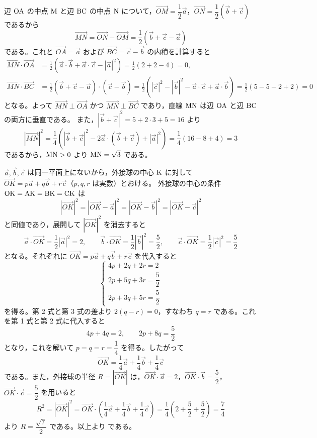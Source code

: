 辺 $\mathrm{OA}$ の中点 $\mathrm{M}$ と辺 $\mathrm{BC}$ の中点 $\mathrm{N}$ について，$\Vec{OM}=\dfrac{1}{2}\vec{a}$，$\Vec{ON}=\dfrac{1}{2}(\vec{b}+\vec{c})$ であるから
\[
  \Vec{MN}=\Vec{ON}-\Vec{OM}=\frac{1}{2}(\vec{b}+\vec{c}-\vec{a})
\]
である。これと $\Vec{OA}=\vec{a}$ および $\Vec{BC}=\vec{c}-\vec{b}$ の内積を計算すると
\begin{align*}
  \Vec{MN}\cdot\Vec{OA} &= \frac{1}{2}(\vec{a}\cdot\vec{b}+\vec{a}\cdot\vec{c}-|\vec{a}|^{2})=\frac{1}{2}(2+2-4)=0, \\
  \Vec{MN}\cdot\Vec{BC} &= \frac{1}{2}(\vec{b}+\vec{c}-\vec{a})\cdot(\vec{c}-\vec{b})=\frac{1}{2}\left(|\vec{c}|^{2}-|\vec{b}|^{2}-\vec{a}\cdot\vec{c}+\vec{a}\cdot\vec{b}\right)=\frac{1}{2}(5-5-2+2)=0
\end{align*}
となる。よって $\Vec{MN}\perp\Vec{OA}$ かつ $\Vec{MN}\perp\Vec{BC}$ であり，直線 $\mathrm{MN}$ は辺 $\mathrm{OA}$ と辺 $\mathrm{BC}$ の両方に垂直である。
また，$|\vec{b}+\vec{c}|^{2}=5+2\cdot 3+5=16$ より
\[
  |\Vec{MN}|^{2}=\frac{1}{4}\left(|\vec{b}+\vec{c}|^{2}-2\vec{a}\cdot(\vec{b}+\vec{c})+|\vec{a}|^{2}\right)
  =\frac{1}{4}(16-8+4)=3
\]
であるから，$\mathrm{MN}>0$ より $\mathrm{MN}=\sqrt{3}$ である。

$\vec{a}, \vec{b}, \vec{c}$ は同一平面上にないから，外接球の中心 $\mathrm{K}$ に対して $\Vec{OK}=p\vec{a}+q\vec{b}+r\vec{c}$（$p, q, r$ は実数）とおける。
外接球の中心の条件 $\mathrm{OK}=\mathrm{AK}=\mathrm{BK}=\mathrm{CK}$ は
\[
  |\Vec{OK}|^{2}=|\Vec{OK}-\vec{a}|^{2}=|\Vec{OK}-\vec{b}|^{2}=|\Vec{OK}-\vec{c}|^{2}
\]
と同値であり，展開して $|\Vec{OK}|^{2}$ を消去すると
\[
  \vec{a}\cdot\Vec{OK}=\frac{1}{2}|\vec{a}|^{2}=2,\qquad
  \vec{b}\cdot\Vec{OK}=\frac{1}{2}|\vec{b}|^{2}=\frac{5}{2},\qquad
  \vec{c}\cdot\Vec{OK}=\frac{1}{2}|\vec{c}|^{2}=\frac{5}{2}
\]
となる。それぞれに $\Vec{OK}=p\vec{a}+q\vec{b}+r\vec{c}$ を代入すると
\[
  \begin{cases}
    4p+2q+2r=2 \\[2pt]
    2p+5q+3r=\dfrac{5}{2} \\[4pt]
    2p+3q+5r=\dfrac{5}{2}
  \end{cases}
\]
を得る。第 2 式と第 3 式の差より $2(q-r)=0$，すなわち $q=r$ である。これを第 1 式と第 2 式に代入すると
\[
  4p+4q=2,\qquad 2p+8q=\frac{5}{2}
\]
となり，これを解いて $p=q=r=\dfrac{1}{4}$ を得る。したがって
\[
  \Vec{OK}=\frac{1}{4}\vec{a}+\frac{1}{4}\vec{b}+\frac{1}{4}\vec{c}
\]
である。また，外接球の半径 $R=|\Vec{OK}|$ は，$\Vec{OK}\cdot\vec{a}=2$，$\Vec{OK}\cdot\vec{b}=\dfrac{5}{2}$，$\Vec{OK}\cdot\vec{c}=\dfrac{5}{2}$ を用いると
\[
  R^{2}=|\Vec{OK}|^{2}=\Vec{OK}\cdot\left(\frac{1}{4}\vec{a}+\frac{1}{4}\vec{b}+\frac{1}{4}\vec{c}\right)
  =\frac{1}{4}\left(2+\frac{5}{2}+\frac{5}{2}\right)=\frac{7}{4}
\]
より $R=\dfrac{\sqrt{7}}{2}$ である。以上より
である。

